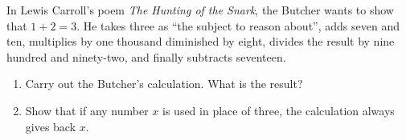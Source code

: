 In Lewis Carroll's poem \emph{The Hunting of the Snark}, the Butcher wants to show that $1+2=3$. He takes three as ``the subject to reason about'', adds seven and ten, multiplies by one thousand diminished by eight, divides the result by nine hundred and ninety-two, and finally subtracts seventeen.
\begin{enumerate}
\item[(a)] Carry out the Butcher's calculation. What is the result?
\item[(b)] Show that if any number $x$ is used in place of three, the calculation always gives back $x$.
\end{enumerate}
